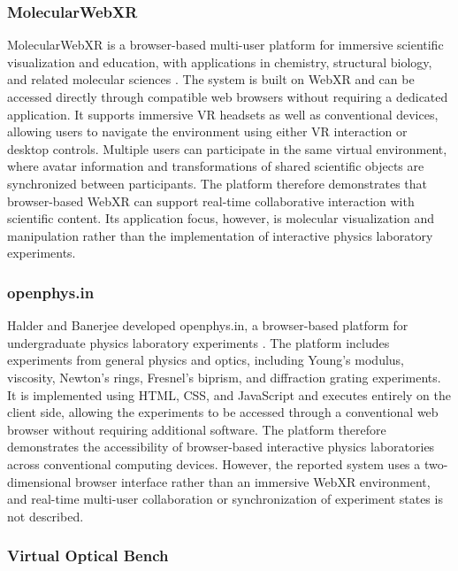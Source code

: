 \subsubsection*{MolecularWebXR}

MolecularWebXR is a browser-based multi-user platform for immersive scientific
visualization and education, with applications in chemistry, structural
biology, and related molecular sciences \cite{cortes2025molecularwebxr}.
The system is built on WebXR and can be accessed directly through compatible
web browsers without requiring a dedicated application. It supports immersive
VR headsets as well as conventional devices, allowing users to navigate the
environment using either VR interaction or desktop controls. Multiple users
can participate in the same virtual environment, where avatar information and
transformations of shared scientific objects are synchronized between
participants. The platform therefore demonstrates that browser-based WebXR can
support real-time collaborative interaction with scientific content. Its
application focus, however, is molecular visualization and manipulation rather
than the implementation of interactive physics laboratory experiments.

\subsubsection*{openphys.in}

Halder and Banerjee developed openphys.in, a browser-based platform for
undergraduate physics laboratory experiments \cite{halder2026openphys}.
The platform includes experiments from general physics and optics, including
Young's modulus, viscosity, Newton's rings, Fresnel's biprism, and diffraction
grating experiments. It is implemented using HTML, CSS, and JavaScript and
executes entirely on the client side, allowing the experiments to be accessed
through a conventional web browser without requiring additional software.
The platform therefore demonstrates the accessibility of browser-based
interactive physics laboratories across conventional computing devices.
However, the reported system uses a two-dimensional browser interface rather
than an immersive WebXR environment, and real-time multi-user collaboration
or synchronization of experiment states is not described.

\subsubsection*{Virtual Optical Bench}

